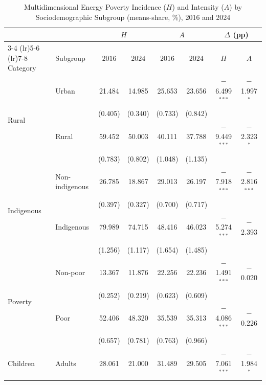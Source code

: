 \documentclass[11pt, a4paper]{article}
\begin{document}
\begin{table}[htbp]
\centering
\caption{Multidimensional Energy Poverty Incidence ($H$) and Intensity ($A$) by Sociodemographic Subgroup (means-share, \%), 2016 and 2024}
\small
\begin{tabularx}{\textwidth}{X X cccccc}
\toprule
\toprule
 & & \multicolumn{2}{c}{$H$} & \multicolumn{2}{c}{$A$} & \multicolumn{2}{c}{$\Delta$ (pp)} \\
\cmidrule(lr){3-4} \cmidrule(lr){5-6} \cmidrule(lr){7-8}
Category & Subgroup & $2016$ & $2024$ & $2016$ & $2024$ & $H$ & $A$ \\ \midrule
\multirow{4}{*}{Rural}
 & Urban        & 21.484 & 14.985 & 25.653 & 23.656 & $-$6.499$^{***}$ & $-$1.997$^{*}$ \\
 &              & {\footnotesize (0.405)} & {\footnotesize (0.340)} & {\footnotesize (0.733)} & {\footnotesize (0.842)} & & \\
 & Rural        & 59.452 & 50.003 & 40.111 & 37.788 & $-$9.449$^{***}$ & $-$2.323$^{*}$ \\
 &              & {\footnotesize (0.783)} & {\footnotesize (0.802)} & {\footnotesize (1.048)} & {\footnotesize (1.135)} & & \\[4pt]
\multirow{4}{*}{Indigenous}
 & Non-indigenous & 26.785 & 18.867 & 29.013 & 26.197 & $-$7.918$^{***}$ & $-$2.816$^{***}$ \\
 &               & {\footnotesize (0.397)} & {\footnotesize (0.327)} & {\footnotesize (0.700)} & {\footnotesize (0.717)} & & \\
 & Indigenous    & 79.989 & 74.715 & 48.416 & 46.023 & $-$5.274$^{***}$ & $-$2.393 \\
 &               & {\footnotesize (1.256)} & {\footnotesize (1.117)} & {\footnotesize (1.654)} & {\footnotesize (1.485)} & & \\[4pt]
\multirow{4}{*}{Poverty}
 & Non-poor & 13.367 & 11.876 & 22.256 & 22.236 & $-$1.491$^{***}$ & $-$0.020 \\
 &          & {\footnotesize (0.252)} & {\footnotesize (0.219)} & {\footnotesize (0.623)} & {\footnotesize (0.609)} & & \\
 & Poor     & 52.406 & 48.320 & 35.539 & 35.313 & $-$4.086$^{***}$ & $-$0.226 \\
 &          & {\footnotesize (0.657)} & {\footnotesize (0.781)} & {\footnotesize (0.763)} & {\footnotesize (0.966)} & & \\[4pt]
\multirow{4}{*}{Children}
 & Adults   & 28.061 & 21.000 & 31.489 & 29.505 & $-$7.061$^{***}$ & $-$1.984$^{*}$ \\

\end{tabularx}
\end{table}
\end{document}
